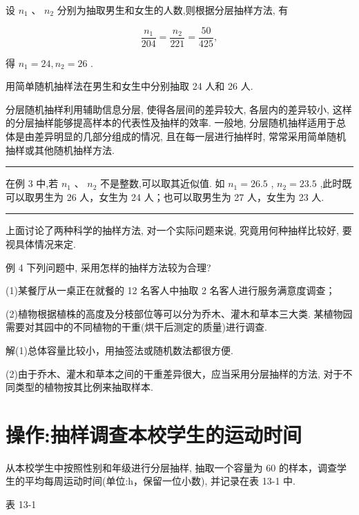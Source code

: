 \documentclass[10pt]{article}
\newcommand{\HRule}{\begin{center}\rule{0.9\linewidth}{0.2mm}\end{center}}
\begin{document}
设 \({n}_{1}\text{ 、 }{n}_{2}\) 分别为抽取男生和女生的人数,则根据分层抽样方法, 有

\[
\frac{{n}_{1}}{204} = \frac{{n}_{2}}{221} = \frac{50}{425},
\]

得 \({n}_{1} = {24},{n}_{2} = {26}\) .

用简单随机抽样法在男生和女生中分别抽取 24 人和 26 人.

分层随机抽样利用辅助信息分层, 使得各层间的差异较大, 各层内的差异较小, 这样的分层抽样能够提高样本的代表性及抽样的效率. 一般地, 分层随机抽样适用于总体是由差异明显的几部分组成的情况, 且在每一层进行抽样时, 常常采用简单随机抽样或其他随机抽样方法.



\HRule

在例 3 中,若 \({n}_{1}\) 、 \({n}_{2}\) 不是整数,可以取其近似值. 如 \({n}_{1} = {26.5}\) , \({n}_{2} = {23.5}\) ,此时既可以取男生为 26 人，女生为 24 人；也可以取男生为 27 人，女生为 23 人.

\HRule



上面讨论了两种科学的抽样方法, 对一个实际问题来说, 究竟用何种抽样比较好, 要视具体情况来定.

例 4 下列问题中, 采用怎样的抽样方法较为合理?

(1)某餐厅从一桌正在就餐的 12 名客人中抽取 2 名客人进行服务满意度调查；

(2)植物根据植株的高度及分枝部位等可以分为乔木、灌木和草本三大类. 某植物园需要对其园中的不同植物的干重(烘干后测定的质量)进行调查.

解(1)总体容量比较小，用抽签法或随机数法都很方便.

(2)由于乔木、灌木和草本之间的干重差异很大，应当采用分层抽样的方法, 对于不同类型的植物按其比例来抽取样本.

\section*{操作:抽样调查本校学生的运动时间}

从本校学生中按照性别和年级进行分层抽样, 抽取一个容量为 60 的样本，调查学生的平均每周运动时间(单位:h，保留一位小数), 并记录在表 13-1 中.

表 13-1
\end{document}
